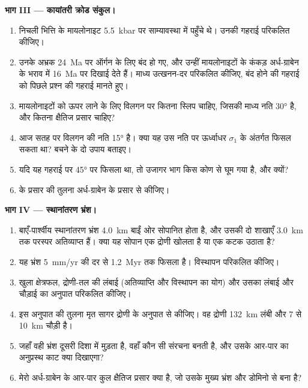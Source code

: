 \begin{problem}
\medskip\noindent\textbf{भाग III --- कायांतरी क्रोड संकुल।}
\begin{enumerate}[resume]
  \item निचली भित्ति के मायलोनाइट \qty{5.5}{kbar} पर साम्यावस्था में पहुँचे थे। उनकी
        गहराई परिकलित कीजिए।
  \item उनके अभ्रक \qty{24}{Ma} पर ऑर्गन के लिए बंद हो गए, और उन्हीं मायलोनाइटों के कंकड़
        अर्ध-ग्राबेन के भराव में \qty{16}{Ma} पर दिखाई देते हैं। माध्य उत्खनन-दर परिकलित कीजिए,
        बंद होने की गहराई को
        पिछले प्रश्न की गहराई मानते हुए।
  \item मायलोनाइटों को ऊपर लाने के लिए विलगन पर कितना स्लिप चाहिए,
        जिसकी माध्य नति \ang{30} है, और कितना क्षैतिज प्रसार चाहिए?
  \item आज सतह पर विलगन की नति \ang{15} है। क्या यह उस नति पर
        ऊर्ध्वाधर $\sigma_1$ के अंतर्गत फिसल सकता था? बचने के दो उपाय बताइए।
  \item यदि यह गहराई पर \ang{45} पर फिसला था, तो उजागर भाग किस कोण से
        घूम गया है, और क्यों?
  \item {} के प्रसार की तुलना
        अर्ध-ग्राबेन के प्रसार से कीजिए।
\end{enumerate}

\medskip\noindent\textbf{भाग IV --- स्थानांतरण भ्रंश।}
\begin{enumerate}[resume]
  \item बाएँ-पार्श्वीय स्थानांतरण भ्रंश \qty{4.0}{km} बाईं ओर सोपानित होता है, और उसकी दो शाखाएँ
        \qty{3.0}{km} तक परस्पर अतिव्याप्त हैं। क्या यह सोपान एक द्रोणी खोलता है
        या एक कटक उठाता है?
  \item यह भ्रंश \qty{5}{mm/yr} की दर से \qty{1.2}{Myr} तक फिसला है। विस्थापन
        परिकलित कीजिए।
  \item खुला क्षेत्रफल, द्रोणी-तल की लंबाई (अतिव्याप्ति और विस्थापन का
        योग) और उसका लंबाई और चौड़ाई का अनुपात परिकलित कीजिए।
  \item इस अनुपात की तुलना मृत सागर द्रोणी के अनुपात से कीजिए। वह द्रोणी
        \qty{132}{km} लंबी और 7 से \qty{10}{km} चौड़ी है।
  \item जहाँ वही भ्रंश दूसरी दिशा में मुड़ता है, वहाँ कौन सी संरचना बनती है, और
        उसके आर-पार का अनुप्रस्थ काट क्या दिखाएगा?
  \item मेरो अर्ध-ग्राबेन के आर-पार कुल क्षैतिज प्रसार क्या है,
        जो उसके मुख्य भ्रंश और डोमिनो से बना है?
\end{enumerate}
\end{problem}
